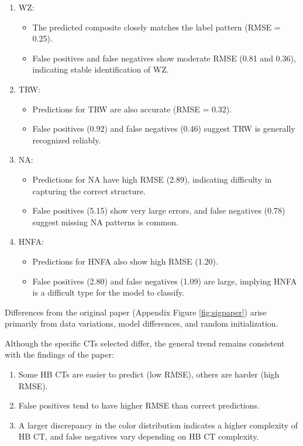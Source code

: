 \documentclass[
]{krantz}
\providecommand{\tightlist}{%
  \setlength{\itemsep}{0pt}\setlength{\parskip}{0pt}}
\begin{document}
\begin{enumerate}
\def\labelenumi{\arabic{enumi}.}
\tightlist
\item
  WZ:

  \begin{itemize}
  \tightlist
  \item
    The predicted composite closely matches the label pattern (RMSE = 0.25).
  \item
    False positives and false negatives show moderate RMSE (0.81 and 0.36), indicating stable identification of WZ.
  \end{itemize}
\item
  TRW:

  \begin{itemize}
  \tightlist
  \item
    Predictions for TRW are also accurate (RMSE = 0.32).
  \item
    False positives (0.92) and false negatives (0.46) suggest TRW is generally recognized reliably.
  \end{itemize}
\item
  NA:

  \begin{itemize}
  \tightlist
  \item
    Predictions for NA have high RMSE (2.89), indicating difficulty in capturing the correct structure.
  \item
    False positives (5.15) show very large errors, and false negatives (0.78) suggest missing NA patterns is common.
  \end{itemize}
\item
  HNFA:

  \begin{itemize}
  \tightlist
  \item
    Predictions for HNFA also show high RMSE (1.20).
  \item
    False positives (2.80) and false negatives (1.09) are large, implying HNFA is a difficult type for the model to classify.
  \end{itemize}
\end{enumerate}

Differences from the original paper (Appendix Figure \ref{fig:sigpaper}) arise primarily from data variations, model differences, and random initialization.

Although the specific CTs selected differ, the general trend remains consistent with the findings of the paper:

\begin{enumerate}
\def\labelenumi{\arabic{enumi}.}
\tightlist
\item
  Some HB CTs are easier to predict (low RMSE), others are harder (high RMSE).
\item
  False positives tend to have higher RMSE than correct predictions.
\item
  A larger discrepancy in the color distribution indicates a higher complexity of HB CT, and false negatives vary depending on HB CT complexity.
\end{enumerate}
\end{document}
